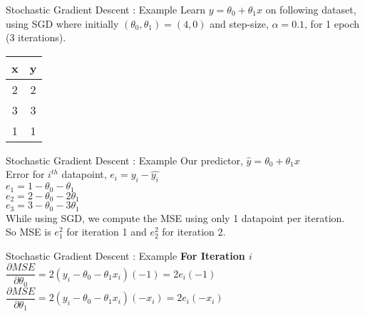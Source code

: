 \documentclass{beamer}
\begin{document}
	\begin{frame}{Stochastic Gradient Descent : Example}
		Learn $y = \theta_0 + \theta_1 x$ on following dataset, using SGD where initially $(\theta_0, \theta_1) = (4,0)$ and step-size, $\alpha  = 0.1$, for 1 epoch (3 iterations). 
		\begin{table}[]
		\centering
		\label{tab:my-table}
		\begin{tabular}{|c|c|}
		\hline
		\textbf{x} & \textbf{y} \\ \hline
		2 & 2 \\ \hline
		3 & 3 \\ \hline
		1 & 1 \\ \hline
		\end{tabular}
		\end{table}
	\end{frame}

	\begin{frame}{Stochastic Gradient Descent : Example}
		Our predictor, $\hat{y} = \theta_0 + \theta_1x$\\
		\vspace{1cm}
		Error for $i^{th}$ datapoint, $e_i = y_i - \hat{y_i}$\\
		$e_1 = 1 - \theta_0 - \theta_1$ \\
		$e_2 = 2 - \theta_0 - 2\theta_1$ \\
		$e_3 = 3 - \theta_0 - 3\theta_1$ \\
		
		\vspace{1cm}
		While using SGD, we compute the MSE using only 1 datapoint per iteration. \\
		So MSE is $e_1^2$ for iteration 1 and $e_2^2$ for iteration 2.
	\end{frame}


	\begin{frame}{Stochastic Gradient Descent : Example}
		\textbf{For Iteration $i$}\\
		\vspace{1cm}
		$\dfrac{\partial MSE}{\partial \theta_0} = 2\left( y_i - \theta_0 -\theta_1x_i \right)\left(-1\right) = 2e_i\left(-1\right)$ \\
		\vspace{2cm}
		$\dfrac{\partial MSE}{\partial \theta_1} = 2\left( y_i - \theta_0 -\theta_1x_i \right)\left(-x_i\right) = 2e_i\left(-x_i\right)$ 
	\end{frame}
\end{document}
